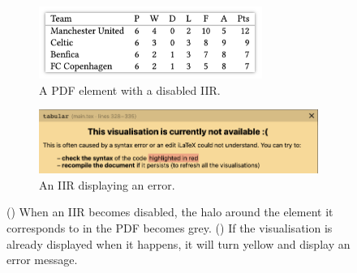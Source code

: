 \begin{figure}[h]
    \centering
    \begin{subfigure}[b]{0.5\textwidth}
        \centering
        \includegraphics[width=0.8\textwidth]{img/disabled-table.png}
        \caption{A PDF element with a disabled IIR.}
        \label{subfig:grey-halo}
    \end{subfigure}%
    \begin{subfigure}[b]{0.5\textwidth}
        \centering
        \includegraphics[width=\textwidth]{img/syntax-error-in-visualisation.png}
        \caption{An IIR displaying an error.}
        \label{subfig:syntax-error-in-iir}
    \end{subfigure}%
    \caption{() When an IIR becomes disabled, the halo around the element it corresponds to in the PDF becomes grey. () If the visualisation is already displayed when it happens, it will turn yellow and display an error message.}
    \label{fig:disabled-visualisations}
\end{figure}